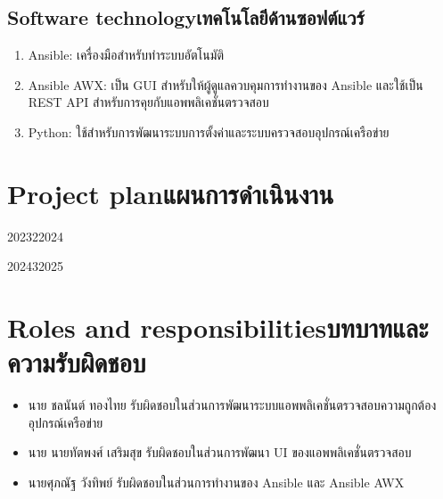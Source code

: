 \subsection{\ifenglish Software technology\else เทคโนโลยีด้านซอฟต์แวร์\fi}
\begin{enumerate}
    \item {Ansible: เครื่องมือสำหรับทำระบบอัตโนมัติ}
    \item {Ansible AWX: เป็น GUI สำหรับให้ผู้ดูแลควบคุมการทำงานของ Ansible และใช้เป็น REST API สำหรับการคุยกับแอพพลิเคชั่นตรวจสอบ}
    \item {Python: ใช้สำหรับการพัฒนาระบบการตั้งค่าและระบบครวจสอบอุปกรณ์เครือข่าย}
\end{enumerate}
\section{\ifenglish Project plan\else แผนการดำเนินงาน\fi}

\begin{plan}{11}{2023}{2}{2024}
\end{plan}

\begin{plan}{11}{2024}{3}{2025}
\end{plan}

\section{\ifenglish Roles and responsibilities\else บทบาทและความรับผิดชอบ\fi}
\begin{itemize}
    \item นาย ชลนันต์ ทองไทย รับผิดชอบในส่วนการพัฒนาระบบแอพพลิเคชั่นตรวจสอบความถูกต้องอุปกรณ์เครือข่าย
    \item นาย นายทัตพงศ์ เสริมสุข รับผิดชอบในส่วนการพัฒนา UI ของแอพพลิเคชั่นตรวจสอบ
    \item นายศุภณัฐ วังทิพย์ รับผิดชอบในส่วนการทำงานของ Ansible และ Ansible AWX
\end{itemize}

